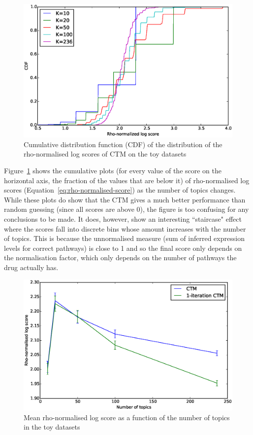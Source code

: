 \documentclass[12pt,a4paper,twoside,openright]{report}
\begin{document}
\begin{figure}[!htb]
\includegraphics[width=\textwidth]{sim-log.eps}
\caption{Cumulative distribution function (CDF) of the distribution of the rho-normalised log scores of CTM on the toy datasets}
\label{fig:sim-log}
\end{figure}

Figure~\ref{fig:sim-log} shows the cumulative plots (for every value of the score on the horizontal axis, the fraction of the values that are below it) of rho-normalised log scores (Equation~\ref{eq:rho-normalised-score}) as the number of topics changes. While these plots do show that the CTM gives a much better performance than random guessing (since all scores are above 0), the figure is too confusing for any conclusions to be made. It does, however, show an interesting ``staircase" effect where the scores fall into discrete bins whose amount increases with the number of topics. This is because the unnormalised measure (sum of inferred expression levels for correct pathways) is close to 1 and so the final score only depends on the normalisation factor, which only depends on the number of pathways the drug actually has.

\begin{figure}[!htb]
\includegraphics[width=\textwidth]{sim-average-rho.eps}
\caption{Mean rho-normalised log score as a function of the number of topics in the toy datasets}
\label{fig:sim-average-rho}
\end{figure}
\end{document}
